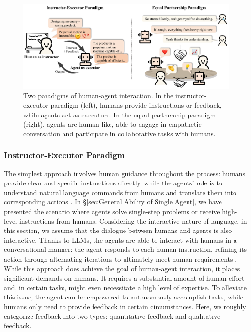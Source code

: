 \begin{figure}[t]
    \centering
    \includegraphics[width=1 \textwidth]{figures/sec4_human.pdf}
    \caption{Two paradigms of human-agent interaction. In the instructor-executor paradigm (left), humans provide instructions or feedback, while agents act as executors. In the equal partnership paradigm (right), agents are human-like, able to engage in empathetic conversation and participate in collaborative tasks with humans.}
    \label{fig: human-agent}
\end{figure} 

\subsubsection{Instructor-Executor Paradigm} \label{Instructor-Executor Paradigm}
The simplest approach involves human guidance throughout the process: humans provide clear and specific instructions directly, while the agents' role is to understand natural language commands from humans and translate them into corresponding actions \cite{DBLP:journals/aim/TellexKDWBTR11, DBLP:conf/iser/MatuszekHZF12, DBLP:conf/aaai/ChaplotSPRS18}. In \S \ref{sec:General Ability of Single Agent}, we have presented the scenario where agents solve single-step problems or receive high-level instructions from humans. Considering the interactive nature of language, in this section, we assume that the dialogue between humans and agents is also interactive. Thanks to LLMs, the agents are able to interact with humans in a conversational manner: the agent responds to each human instruction, refining its action through alternating iterations to ultimately meet human requirements \cite{DBLP:journals/corr/abs-2305-16291}. While this approach does achieve the goal of human-agent interaction, it places significant demands on humans. It requires a substantial amount of human effort and, in certain tasks, might even necessitate a high level of expertise. To alleviate this issue, the agent can be empowered to autonomously accomplish tasks, while humans only need to provide feedback in certain circumstances. Here, we roughly categorize feedback into two types: quantitative feedback and qualitative feedback.

